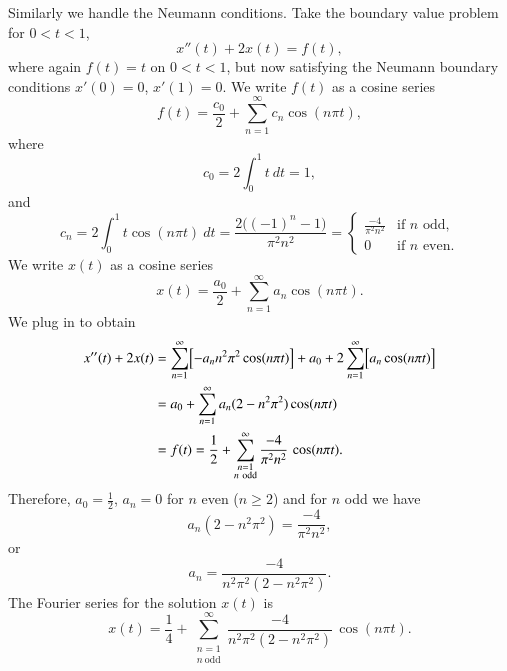 \documentclass[12pt]{book}
\begin{document}
\begin{example}
Similarly we handle the Neumann conditions.
Take the boundary value problem for $0 < t < 1$,
\begin{equation*}
x''(t) + 2 x(t) = f(t) ,
\end{equation*}
where again $f(t) = t$ on $0 < t < 1$, but now satisfying
the Neumann boundary conditions
$x'(0) = 0$, $x'(1)=0$.
We write $f(t)$ as a cosine series
\begin{equation*}
f(t) = \frac{c_0}{2} + \sum_{n=1}^\infty c_n \cos (n \pi t) ,
\end{equation*}
where
\begin{equation*}
c_0 = 2 \int_0^1 t ~dt = 1 ,
\end{equation*}
and
\begin{equation*}
c_n = 2 \int_0^1 t \cos (n \pi t) ~dt =
\frac{2\bigl({(-1)}^n-1\bigr)}{\pi^2 n^2} = 
\begin{cases}
\frac{-4}{\pi^2 n^2} & \text{if } n \text{ odd} , \\
0 & \text{if } n \text{ even}.
\end{cases}
\end{equation*}
We write $x(t)$ as a cosine series
\begin{equation*}
x(t) = \frac{a_0}{2} + \sum_{n=1}^\infty a_n \cos (n \pi t) .
\end{equation*}
We plug in to obtain 
\begin{equation*}
\begin{split}
x''(t) + 2 x(t) & =
\sum_{n=1}^\infty \Bigl[ - a_n n^2 \pi^2 \cos (n \pi t) \Bigr]
+
a_0 +
2
\sum_{n=1}^\infty \Bigl[ a_n \cos (n \pi t) \Bigr]
\\
& =
a_0 +
\sum_{n=1}^\infty a_n (2 - n^2 \pi^2 ) \cos (n \pi t)
\\
& = f(t)
=
\frac{1}{2} +
\sum_{\substack{n=1\\n~\text{odd}}}^\infty
\frac{-4}{\pi^2 n^2} \, \cos (n \pi t) .
\end{split}
\end{equation*}
Therefore, $a_0 = \frac{1}{2}$, $a_n = 0$ for $n$ even ($n \geq 2$) and for
$n$ odd we have
\begin{equation*}
a_n (2 - n^2 \pi^2)
=
\frac{-4}{\pi^2 n^2} ,
\end{equation*}
or
\begin{equation*}
a_n
=
\frac{-4}{n^2 \pi^2 (2 - n^2 \pi^2)} .
\end{equation*}
The Fourier series for the solution $x(t)$ is
\begin{equation*}
x(t) = 
\frac{1}{4} +
\sum_{\substack{n=1\\n~\text{odd}}}^\infty
\frac{-4}{n^2 \pi^2 (2 - n^2 \pi^2)} \,
\cos (n \pi t) .
\end{equation*}
\end{example}
\end{document}
